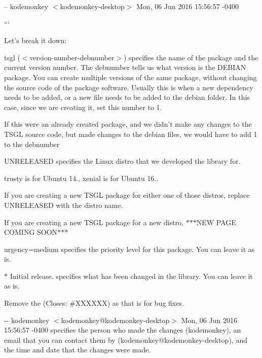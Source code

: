 -- kodemonkey $<$kodemonkey-\/desktop$>$ Mon, 06 Jun 2016 15\-:56\-:57 -\/0400

```

Let's break it down\-:


\begin{DoxyItemize}
\item {\ttfamily tsgl ($<$version-\/number-\/debnumber$>$)} specifies the name of the package and the current version number. The {\ttfamily debnumber} tells us what version is the D\-E\-B\-I\-A\-N package. You can create multiple versions of the same package, without changing the source code of the package software. Usually this is when a new dependency needs to be added, or a new file needs to be added to the {\ttfamily debian} folder. In this case, since we are creating it, set this number to 1.
\end{DoxyItemize}

If this were an already created package, and we didn't make any changes to the T\-S\-G\-L source code, but made changes to the {\ttfamily debian} files, we would have to add 1 to the {\ttfamily debnumber}


\begin{DoxyItemize}
\item {\ttfamily U\-N\-R\-E\-L\-E\-A\-S\-E\-D} specifies the Linux distro that we developed the library for.
\end{DoxyItemize}

{\ttfamily trusty} is for {\ttfamily Ubuntu 14.}, {\ttfamily xenial} is for {\ttfamily Ubuntu 16.}.

If you are creating a new T\-S\-G\-L package for either one of those distros, replace {\ttfamily U\-N\-R\-E\-L\-E\-A\-S\-E\-D} with the distro name.

If you are creating a new T\-S\-G\-L package for a new distro, $\ast$$\ast$$\ast$\-N\-E\-W P\-A\-G\-E C\-O\-M\-I\-N\-G S\-O\-O\-N$\ast$$\ast$$\ast$


\begin{DoxyItemize}
\item {\ttfamily urgency=medium} specifies the priority level for this package. You can leave it as is.
\item {\ttfamily $\ast$ Initial release.} specifies what has been changed in the library. You can leave it as is.
\item Remove the {\ttfamily (Closes\-: \#\-X\-X\-X\-X\-X\-X)} as that is for bug fixes.
\item {\ttfamily -\/-\/ kodemonkey $<$kodemonkey@kodemonkey-\/desktop$>$ Mon, 06 Jun 2016 15\-:56\-:57 -\/0400} specifies the person who made the changes ({\ttfamily kodemonkey}), an email that you can contact them by ({\ttfamily kodemonkey@kodemonkey-\/desktop}), and the time and date that the changes were made.
\end{DoxyItemize}

